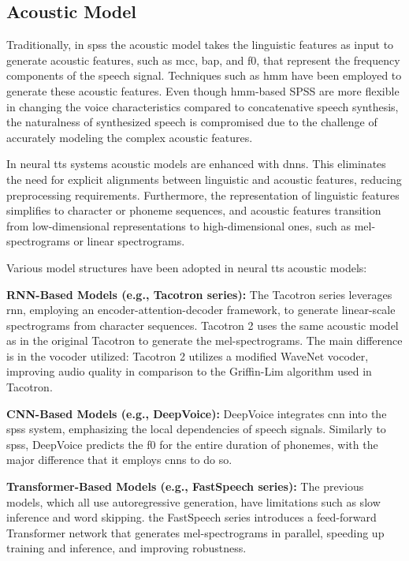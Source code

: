 \subsection{Acoustic Model}
Traditionally, in \gls{spss} the acoustic model takes the linguistic features as input to generate acoustic features, such as \gls{mcc}, \gls{bap}, and \gls{f0}, that represent the frequency components of the speech signal\cite{acoustic2023models, yoshimura1999simultaneous}. Techniques such as \gls{hmm} have been employed to generate these acoustic features\cite{tokuda2013speech}. Even though \gls{hmm}-based SPSS are more flexible in changing the voice characteristics compared to concatenative speech synthesis, the naturalness of synthesized speech is compromised due to the challenge of accurately modeling the complex acoustic features\cite{zen2015acoustic}.

In neural \gls{tts} systems acoustic models are enhanced with \gls{dnn}s. This eliminates the need for explicit alignments between linguistic and acoustic features, reducing preprocessing requirements. Furthermore, the representation of linguistic features simplifies to character or phoneme sequences, and acoustic features transition from low-dimensional representations to high-dimensional ones, such as mel-spectrograms or linear spectrograms\cite{acoustic2023models}.

Various model structures have been adopted in neural \gls{tts} acoustic models:

\textbf{RNN-Based Models (e.g., Tacotron series):} The Tacotron series leverages \gls{rnn}, employing an encoder-attention-decoder framework, to generate linear-scale spectrograms from character sequences\cite{wang2017tacotron, acoustic2023models}. Tacotron 2 uses the same acoustic model as in the original Tacotron to generate the mel-spectrograms. The main difference is in the vocoder utilized: Tacotron 2 utilizes a modified WaveNet vocoder, improving audio quality in comparison to the Griffin-Lim algorithm used in Tacotron\cite{shen2018natural}.

\textbf{CNN-Based Models (e.g., DeepVoice):} DeepVoice integrates \gls{cnn} into the \gls{spss} system, emphasizing the local dependencies of speech signals. Similarly to \gls{spss}, DeepVoice predicts the \gls{f0} for the entire duration of phonemes, with the major difference that it employs \gls{cnn}s to do so\cite{arik2017deep}.

\textbf{Transformer-Based Models (e.g., FastSpeech series):} %
The previous models, which all use autoregressive generation, have limitations such as slow inference and word skipping\cite{acoustic2023models}. the FastSpeech series introduces a feed-forward Transformer network that generates mel-spectrograms in parallel, speeding up training and inference, and improving robustness\cite{ren2019fastspeech, ren2021fastspeech}.

